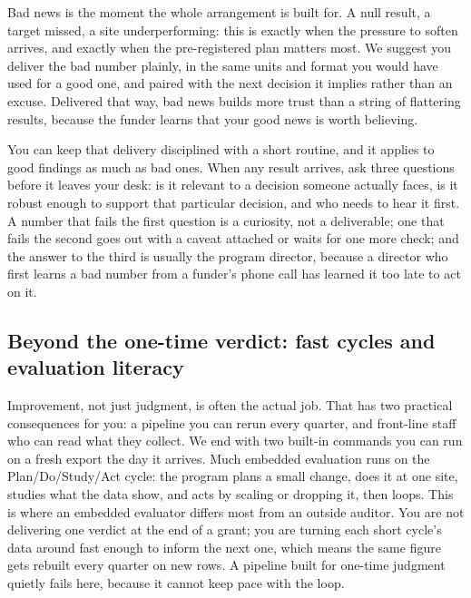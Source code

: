 Bad news is the moment the whole arrangement is built for. A null result, a target missed, a site underperforming: this is exactly when the pressure to soften arrives, and exactly when the pre-registered plan matters most. We suggest you deliver the bad number plainly, in the same units and format you would have used for a good one, and paired with the next decision it implies rather than an excuse. Delivered that way, bad news builds more trust than a string of flattering results, because the funder learns that your good news is worth believing.

You can keep that delivery disciplined with a short routine, and it applies to good findings as much as bad ones. When any result arrives, ask three questions before it leaves your desk: is it relevant to a decision someone actually faces, is it robust enough to support that particular decision, and who needs to hear it first. A number that fails the first question is a curiosity, not a deliverable; one that fails the second goes out with a caveat attached or waits for one more check; and the answer to the third is usually the program director, because a director who first learns a bad number from a funder's phone call has learned it too late to act on it.

\subsection{Beyond the one-time verdict: fast cycles and evaluation literacy}\label{sec:ch01-beyond-verdict}
Improvement, not just judgment, is often the actual job. That has two practical consequences for you: a pipeline you can rerun every quarter, and front-line staff who can read what they collect. We end with two built-in commands you can run on a fresh export the day it arrives. Much embedded evaluation runs on the Plan\slash Do\slash Study\slash Act cycle: the program plans a small change, does it at one site, studies what the data show, and acts by scaling or dropping it, then loops. This is where an embedded evaluator differs most from an outside auditor. You are not delivering one verdict at the end of a grant; you are turning each short cycle's data around fast enough to inform the next one, which means the same figure gets rebuilt every quarter on new rows. A pipeline built for one-time judgment quietly fails here, because it cannot keep pace with the loop.

